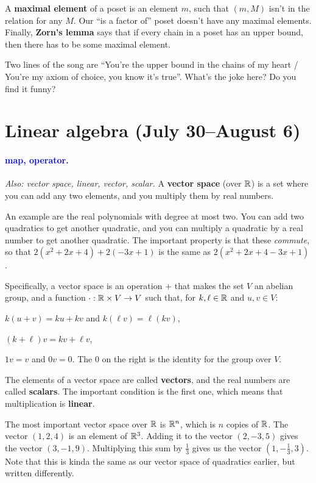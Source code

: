 \documentclass[11pt,paper=letter]{scrartcl}
\renewcommand\wp[1]{\paragraph{\textcolor{Blue}{#1.}} \hspace{-1em}}
\newcommand\wl[1]{\label{w:#1}}
\newcommand\oww[1]{\textit{Also: #1.}}
\begin{document}
A \textbf{maximal element} of a poset is an element $m$, such that $(m, M)$ isn't in the relation for any $M$. Our ``is a factor of'' poset doesn't have any maximal elements. Finally, \textbf{Zorn's lemma} says that if every chain in a poset has an upper bound, then there has to be some maximal element.

\begin{exrboxed}
  Two lines of the song are ``You're the upper bound in the chains of my heart / You're my axiom of choice, you know it's true''. What's the joke here? Do you find it funny?
\end{exrboxed}

\section{Linear algebra (July 30--August 6)}

\wp{map, operator}
\wl{map}
\wl{operator}
\oww{vector space, linear, vector, scalar}
A \textbf{vector space} (over $\mathbb R$) is a set where you can add any two elements, and you multiply them by real numbers.

An example are the real polynomials with degree at most two. You can add two quadratics to get another quadratic, and you can multiply a quadratic by a real number to get another quadratic. The important property is that these \textit{commute}, so that $2 (x^2 + 2x + 4) + 2 (-3x + 1)$ is the same as $2 (x^2 + 2x + 4 - 3x + 1)$.

Specifically, a vector space is an operation $+$ that makes the set $V$ an abelian group, and a function $\cdot: \mathbb R \times V \to V$ such that, for $k, \ell \in \mathbb R$ and $u, v \in V$:

\begin{itemthin}
  \item $k(u + v) = ku + kv$ and $k(\ell v) = \ell (kv)$,
  \item $(k + \ell)v = kv + \ell v$,
  \item $1v = v$ and $0v = 0$. The $0$ on the right is the identity for the group over $V$.
\end{itemthin}

The elements of a vector space are called \textbf{vectors}, and the real numbers are called \textbf{scalars}. The important condition is the first one, which means that multiplication is \textbf{linear}.

The most important vector space over $\mathbb R$ is $\mathbb R^n$, which is $n$ copies of $\mathbb R$. The vector $(1, 2, 4)$ is an element of $\mathbb R^3$. Adding it to the vector $(2, -3, 5)$ gives the vector $(3, -1, 9)$. Multiplying this sum by $ \frac{1}{3} $ gives us the vector $(1, - \frac{1}{3} , 3)$. Note that this is kinda the same as our vector space of quadratics earlier, but written differently.
\end{document}
